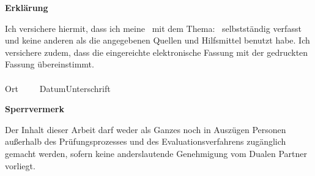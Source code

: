 
\newpage
\thispagestyle{empty}
\begin{center}
\Large\bfseries Erklärung
\end{center}
\medskip
\noindent

\noindent Ich versichere hiermit, dass ich meine \Was\ mit dem Thema: \glqq \Titel \grqq\
selbstständig verfasst und keine anderen als die angegebenen Quellen und Hilfsmittel benutzt habe. Ich versichere zudem, dass die eingereichte elektronische Fassung mit der gedruckten Fassung übereinstimmt.
\vspace{3cm}
\noindent \\
\underline{\hspace{4cm}}\hfill\underline{\hspace{6cm}}\\
Ort~~~~~Datum\hfill Unterschrift\hspace{4cm}


\vfill
\begin{center}
\Large\bfseries Sperrvermerk
\end{center}
\medskip
\noindent
Der Inhalt dieser Arbeit darf weder als Ganzes noch in Auszügen Personen
außerhalb des Prüfungsprozesses und des Evaluationsverfahrens zugänglich gemacht
werden, sofern keine anderslautende Genehmigung vom Dualen Partner vorliegt.

\endinput
